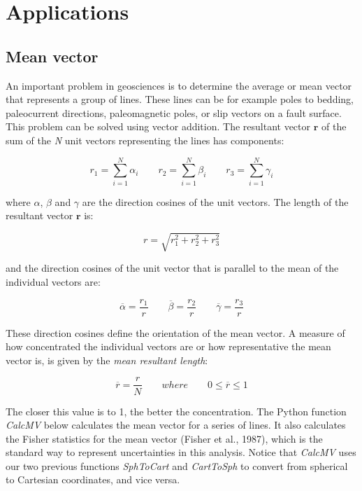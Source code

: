 \documentclass[a4paper , 12pt]{book}
\begin{document}
\section{Applications}

\subsection{Mean vector}

An important problem in geosciences is to determine the average or mean vector that represents a group of lines. These lines can be for example poles to bedding, paleocurrent directions, paleomagnetic poles, or slip vectors on a fault surface. This problem can be solved using vector addition. The resultant vector $\mathbf{r}$ of the sum of the \textit{N} unit vectors representing the lines has components:

\begin{equation}
    r_1=\sum_{i=1}^{N}\alpha_i\qquad r_2=\sum_{i=1}^{N}\beta_i\qquad r_3=\sum_{i=1}^{N}\gamma_i \tag{4.15a}
\end{equation}

where $\alpha$, $\beta$ and $\gamma$ are the direction cosines of the unit vectors. The length of the resultant vector $\mathbf{r}$ is:

\begin{equation}
    r=\sqrt{r_1^2+r_2^2+r_3^2} \tag{4.15b}
\end{equation}

and the direction cosines of the unit vector that is parallel to the mean of the individual vectors are:

\begin{equation}
    \overline{\alpha}=\frac{r_1}{r}\qquad \overline{\beta}=\frac{r_2}{r}\qquad \overline{\gamma}=\frac{r_3}{r} \tag{4.15c}
\end{equation}

These direction cosines define the orientation of the mean vector. A measure of how concentrated the individual vectors are or how representative the mean vector is, is given by the \textit{mean resultant length}:

\begin{equation}
    \overline{r}=\frac{r}{N}\qquad where\qquad 0\leq\overline{r}\leq 1 \tag{4.15d}
\end{equation}

The closer this value is to 1, the better the concentration. The Python function \textit{CalcMV} below calculates the mean vector for a series of lines. It also calculates the Fisher statistics for the mean vector (Fisher et al., 1987), which is the standard way to represent uncertainties in this analysis. Notice that \textit{CalcMV} uses our two previous functions \textit{SphToCart} and \textit{CartToSph} to convert from spherical to Cartesian coordinates, and vice versa.
\end{document}
